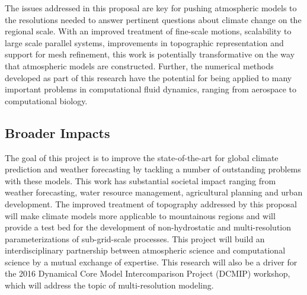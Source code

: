 \documentclass[11pt]{article}
\begin{document}
The issues addressed in this proposal are key for pushing atmospheric models to the resolutions needed to answer pertinent questions about climate change on the regional scale.  With an improved treatment of fine-scale motions, scalability to large scale parallel systems, improvements in topographic representation and support for mesh refinement, this work is potentially transformative on the way that atmospheric models are constructed.  Further, the numerical methods developed as part of this research have the potential for being applied to many important problems in computational fluid dynamics, ranging from aerospace to computational biology.

\vspace{-0.5cm}
\subsection*{Broader Impacts}
\vspace{-0.5cm}

The goal of this project is to improve the state-of-the-art for global climate prediction and weather forecasting by tackling a number of outstanding problems with these models.  This work has substantial societal impact ranging from weather forecasting, water resource management, agricultural planning and urban development.  The improved treatment of topography addressed by this proposal will make climate models more applicable to mountainous regions and will provide a test bed for the development of non-hydrostatic and multi-resolution parameterizations of sub-grid-scale processes.  This project will build an interdisciplinary partnership between atmospheric science and computational science by a mutual exchange of expertise.  This research will also be a driver for the 2016 Dynamical Core Model Intercomparison Project (DCMIP) workshop, which will address the topic of multi-resolution modeling.
\end{document}
